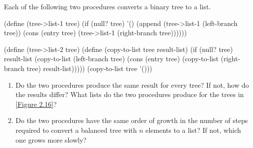 \begin{exercise}
	\label{Exercise 2.63}
	Each of the following two procedures converts a binary tree to a list.
	\begin{scheme}
	  (define (tree->list-1 tree)
	    (if (null? tree)
	        '()
	        (append (tree->list-1 (left-branch tree))
	                (cons (entry tree)
	                      (tree->list-1 (right-branch tree))))))

	  (define (tree->list-2 tree)
	    (define (copy-to-list tree result-list)
	      (if (null? tree)
	          result-list
	          (copy-to-list (left-branch tree)
	                        (cons (entry tree)
	                              (copy-to-list (right-branch tree)
	                                            result-list)))))
	    (copy-to-list tree '()))
	\end{scheme}
	\begin{enumerate}[label = \alph*., leftmargin = *]

		\item
			Do the two procedures produce the same result for every tree?
			If not, how do the results differ?
			What lists do the two procedures produce for the trees in \cref{Figure 2.16}?

		\item
			Do the two procedures have the same order of growth in the number of steps required to convert a balanced tree with \( n \) elements to a list?
			If not, which one grows more slowly?

	\end{enumerate}
\end{exercise}



